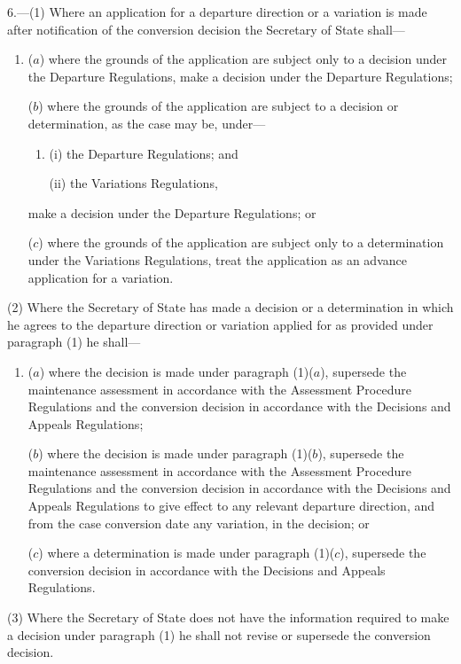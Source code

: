 \documentclass[12pt,a4paper]{article}
\begin{document}
6.---(1)  Where an application for a departure direction or a variation is made after notification of the conversion decision the Secretary of State shall—
\begin{enumerate}\item[]
($a$) where the grounds of the application are subject only to a decision under the Departure Regulations, make a decision under the Departure Regulations;

($b$) where the grounds of the application are subject to a decision or determination, as the case may be, under—
\begin{enumerate}\item[]
(i) the Departure Regulations; and

(ii) the Variations Regulations,
\end{enumerate}
make a decision under the Departure Regulations; or

($c$) where the grounds of the application are subject only to a determination under the Variations Regulations, treat the application as an advance application for a variation.
\end{enumerate}

(2) Where the Secretary of State has made a decision or a determination in which he agrees to the departure direction or variation applied for as provided under paragraph (1) he shall—
\begin{enumerate}\item[]
($a$) where the decision is made under paragraph (1)($a$), supersede the maintenance assessment in accordance with the Assessment Procedure Regulations and the conversion decision in accordance with the Decisions and Appeals Regulations;

($b$) where the decision is made under paragraph (1)($b$), supersede the maintenance assessment in accordance with the Assessment Procedure Regulations and the conversion decision in accordance with the Decisions and Appeals Regulations to give effect to any relevant departure direction, and from the case conversion date any variation, in the decision; or

($c$) where a determination is made under paragraph (1)($c$), supersede the conversion decision in accordance with the Decisions and Appeals Regulations.
\end{enumerate}

(3) Where the Secretary of State does not have the information required to make a decision under paragraph (1) he shall not revise or supersede the conversion decision.
\end{document}
